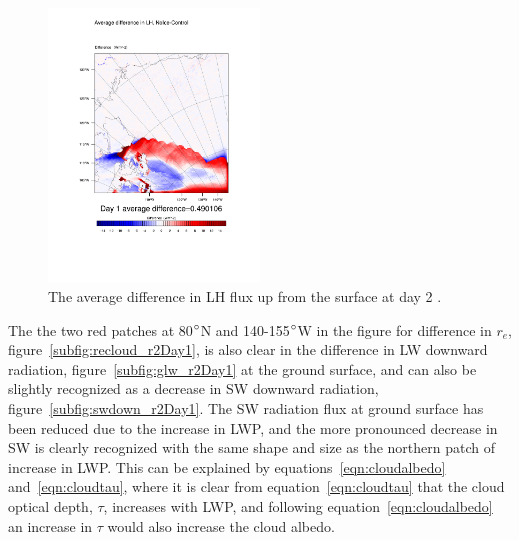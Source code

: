 \begin{figure}
\centering
\includegraphics[width=0.5\textwidth]{results/noice/diff_NoIce_LH_Day1.pdf}
\caption{The average difference in LH flux up from the surface at day 2 .}
\label{fig:lh_r2Day2}
\end{figure}

The the two red patches at 80$\degree$N and 140-155$\degree$W in the figure for difference in $r_e$, figure~\ref{subfig:recloud_r2Day1}, is also clear in the difference in LW downward radiation, figure~\ref{subfig:glw_r2Day1} at the ground surface, and can also be slightly recognized as a decrease in SW downward radiation, figure~\ref{subfig:swdown_r2Day1}. The SW radiation flux at ground surface has been reduced due to the increase in LWP, and the more pronounced decrease in SW is clearly recognized with the same shape and size as the northern patch of increase in LWP. This can be explained by equations~\ref{eqn:cloudalbedo} and~\ref{eqn:cloudtau}, where it is clear from equation~\ref{eqn:cloudtau} that the cloud optical depth, $\tau$, increases with LWP, and following equation~\ref{eqn:cloudalbedo} an increase in $\tau$ would also increase the cloud albedo.

